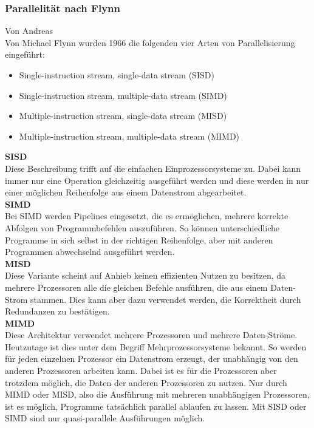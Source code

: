 \documentclass[12pt]{article}
\begin{document}
\subsubsection{Parallelität nach Flynn}
Von Andreas\\

Von Michael Flynn wurden 1966 die folgenden vier Arten von Parallelisierung eingeführt: \cite{Flynn}

\begin{itemize}
\item Single-instruction stream, single-data stream (SISD)
\item Single-instruction stream, multiple-data stream (SIMD)
\item Multiple-instruction stream, single-data stream (MISD)
\item Multiple-instruction stream, multiple-data stream (MIMD)
\end{itemize}

\noindent
\textbf{SISD}\\
Diese Beschreibung trifft auf die einfachen Einprozessorsysteme zu. Dabei kann immer nur eine Operation gleichzeitig ausgeführt werden und diese werden in nur einer möglichen Reihenfolge aus einem Datenstrom abgearbeitet.\\

\noindent
\textbf{SIMD}\\
Bei SIMD werden Pipelines eingesetzt, die es ermöglichen, mehrere korrekte Abfolgen von Programmbefehlen auszuführen. So können unterschiedliche Programme in sich selbst in der richtigen Reihenfolge, aber mit anderen Programmen abwechselnd ausgeführt werden.\\

\noindent
\textbf{MISD}\\
Diese Variante scheint auf Anhieb keinen effizienten Nutzen zu besitzen, da mehrere Prozessoren alle die gleichen Befehle ausführen, die aus einem Daten-Strom stammen. Dies kann aber dazu verwendet werden, die Korrektheit durch Redundanzen zu bestätigen. \\

\noindent
\textbf{MIMD}\\
Diese Architektur verwendet mehrere Prozessoren und mehrere Daten-Ströme. Heutzutage ist dies unter dem Begriff Mehrprozessorsysteme bekannt. So werden für jeden einzelnen Prozessor ein Datenstrom erzeugt, der unabhängig von den anderen Prozessoren arbeiten kann. Dabei ist es für die Prozessoren aber trotzdem möglich, die Daten der anderen Prozessoren zu nutzen. Nur durch MIMD oder MISD, also die Ausführung mit mehreren unabhängigen Prozessoren, ist es möglich, Programme tatsächlich parallel ablaufen zu lassen. Mit SISD oder SIMD sind nur quasi-parallele Ausführungen möglich.\\
\end{document}
